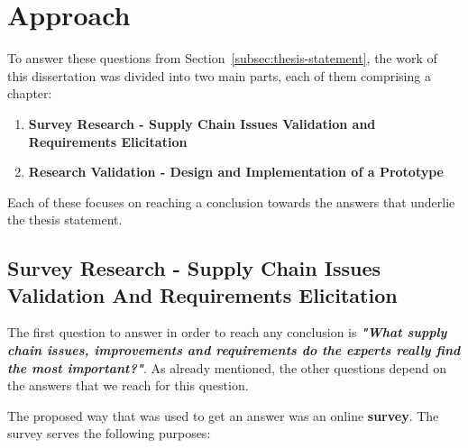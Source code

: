 
\section{Approach}


To answer these questions from Section~\ref{subsec:thesis-statement}, the work of this dissertation was divided into two main parts, each of them comprising a chapter:
\begin{enumerate}
\item \textbf{Survey Research - Supply Chain Issues Validation and Requirements Elicitation}
\item \textbf{Research Validation - Design and Implementation of a Prototype}
\end{enumerate}

Each of these focuses on reaching a conclusion towards the answers that underlie the thesis statement.

\subsection{Survey Research - Supply Chain Issues Validation And Requirements Elicitation}
\label{sec:survey-approach}
The first question to answer in order to reach any conclusion is \textbf{\textit{"What supply chain issues, improvements and requirements do the experts really find the most important?"}}. As already mentioned, the other questions depend on the answers that we reach for this question.

The proposed way that was used to get an answer was an online \textbf{survey}. The survey serves the following purposes:

